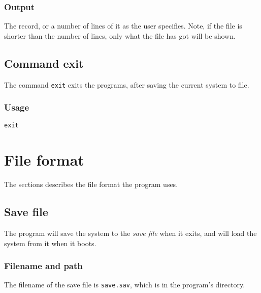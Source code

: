 \subsubsection{Output}
The record, or a number of lines of it as the user specifies. Note, if the file is shorter than the number of lines, only what the file has got will be shown.

\subsection{Command exit}
The command \texttt{exit} exits the programs, after saving the current system to file.

\subsubsection{Usage}
\begin{center}
	\texttt{exit}
\end{center}

\section{File format}
The sections describes the file format the program uses.

\subsection{Save file}
The program will save the system to the \emph{save file} when it exits, and will load the system from it when it boots.

\subsubsection{Filename and path}
The filename of the save file is \texttt{save.sav}, which is in the program's directory.

